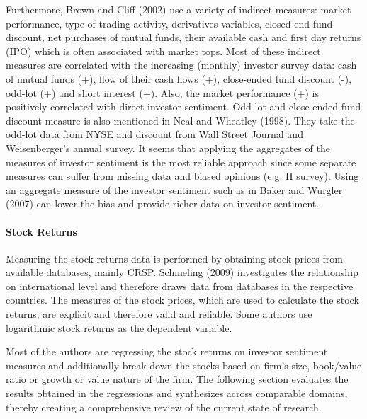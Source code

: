 \par
Furthermore, Brown and Cliff (2002) use a variety of indirect measures: market performance, type of trading activity, derivatives variables, closed-end fund discount, net purchases of mutual funds, their available cash and first day returns (IPO) which is often associated with market tops. Most of these indirect measures are correlated with the increasing (monthly) investor survey data: cash of mutual funds (+), flow of their cash flows (+), close-ended fund discount (-), odd-lot (+) and short interest (+). Also, the market performance (+) is positively correlated with direct investor sentiment. Odd-lot and close-ended fund discount measure is also mentioned in Neal and Wheatley (1998). They take the odd-lot data from NYSE and discount from Wall Street Journal and Weisenberger's annual survey.
\newline
It seems that applying the aggregates of the measures of investor sentiment is the most reliable approach since some separate measures can suffer from missing data and biased opinions (e.g. II survey). Using an aggregate measure of the investor sentiment such as in Baker and Wurgler (2007) can lower the bias and provide richer data on investor sentiment.

\paragraph{Stock Returns}
Measuring the stock returns data is performed by obtaining stock prices from available databases, mainly CRSP. Schmeling (2009) investigates the relationship on international level and therefore draws data from databases in the respective countries. The measures of the stock prices, which are used to calculate the stock returns, are explicit and therefore valid and reliable. Some authors use logarithmic stock returns as the dependent variable.
\par
Most of the authors are regressing the stock returns on investor sentiment measures and additionally break down the stocks based on firm’s size, book/value ratio or growth or value nature of the firm. The following section evaluates the results obtained in the regressions and synthesizes across comparable domains, thereby creating a comprehensive review of the current state of research.